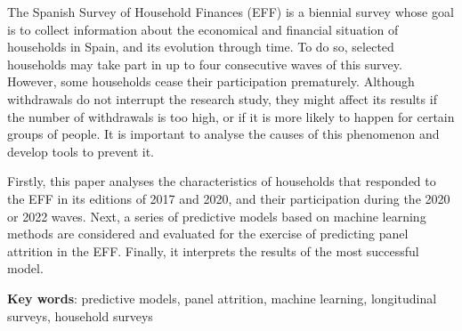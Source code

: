 \onehalfspacing

The Spanish Survey of Household Finances (EFF) is a biennial survey whose goal is to collect information about the economical and financial situation of households in Spain, and its evolution through time. To do so, selected households may take part in up to four consecutive waves of this survey. However, some households cease their participation prematurely. Although withdrawals do not interrupt the research study, they might affect its results if the number of withdrawals is too high, or if it is more likely to happen for certain groups of people. It is important to analyse the causes of this phenomenon and develop tools to prevent it.

Firstly, this paper analyses the characteristics of households that responded to the EFF in its editions of 2017 and 2020, and their participation during the 2020 or 2022 waves. Next, a series of predictive models based on machine learning methods are considered and evaluated for the exercise of predicting panel attrition in the EFF. Finally, it interprets the results of the most successful model.

\vspace{1.5cm}

\textbf{Key words}: predictive models, panel attrition, machine learning, longitudinal surveys, household surveys